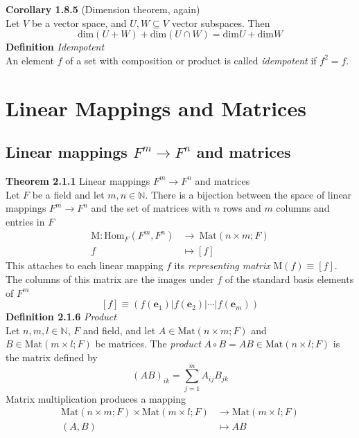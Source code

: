 \documentclass[8pt,landscape]{article}
\begin{document}
\begin{multicols}{3}
    \textbf{Corollary 1.8.5} (Dimension theorem, again) \\
    Let $V$ be a vector space, and $U,W \subseteq V$ vector subspaces. Then
    \[
        \text{dim}(U + W) + \text{dim}(U \cap W) = \text{dim}U + \text{dim}W
    \]
    \textbf{Definition} \emph{Idempotent} \\
    An element $f$ of a set with composition or product is called \emph{idempotent} if
    $f^2 = f$.

    \section{Linear Mappings and Matrices}

    \subsection{Linear mappings $F^m \to F^n$ and matrices}

    \textbf{Theorem 2.1.1} Linear mappings $F^m \to F^n$ and matrices \\
    Let $F$ be a field and let $m, n \in \mathbb{N}$.
    There is a bijection between the space of linear mappings $F^m \to F^n$
    and the set of matrices with $n$ rows and $m$ columns and entries in $F$
    \begin{align*}{}
        \mathrm{M} : \text{Hom}_F(F^m, F^n) &\to \ \text{Mat}(n \times m ; F) \\
        f &\mapsto [f]
    \end{align*}
    This attaches to each linear mapping $f$ its \emph{representing matrix}
    $\mathrm{M}(f) \equiv [f]$.
    The columns of this matrix are the images under $f$ of the standard basis elements of
    $F^m$
    \[
        [f] \equiv (f(\textbf{e}_1)|f(\textbf{e}_2)| \cdots | f(\textbf{e}_m))
    \]
    \textbf{Definition 2.1.6} \emph{Product} \\
    Let $n, m, l \in \mathbb{N}$, $F$ and field, and let
    $A \in \mathrm{Mat}(n \times m; F)$ and $B \in \mathrm{Mat}(m \times l; F)$
    be matrices.
    The \emph{product} $A \circ B = AB \in \mathrm{Mat}(n \times l; F)$
    is the matrix defined by
    \[
        {(AB)}_{ik} = \sum_{j=1}^m A_{ij}B_{jk}
    \]
    Matrix multiplication produces a mapping
    \begin{align*}{}
        \mathrm{Mat}(n \times m;F) \times \mathrm{Mat}(m \times l; F) &\to
        \mathrm{Mat}(m \times l; F) \\
        (A,B) &\mapsto AB
    \end{align*}


\end{multicols}
\end{document}
